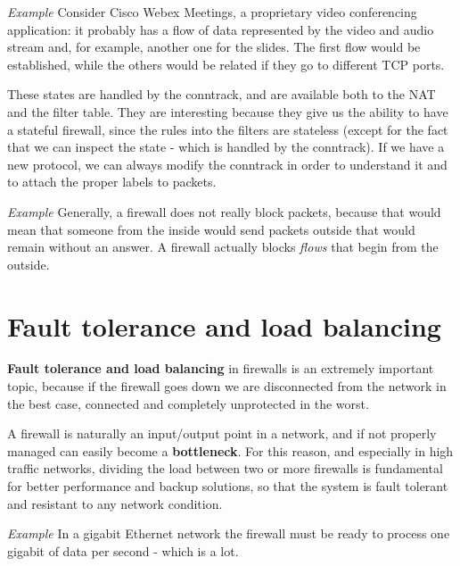 \vspace{0.5em}

\emph{Example} Consider Cisco Webex Meetings, a proprietary video conferencing application: it probably has a flow of data represented by the video and audio stream and, for example, another one for the slides. The first flow would be established, while the others would be related if they go to different TCP ports.

\vspace{0.5em}
	
These states are handled by the conntrack, and are available both to the NAT and the filter table. They are interesting because they give us the ability to have a stateful firewall, since the rules into the filters are stateless (except for the fact that we can inspect the state - which is handled by the conntrack). If we have a new protocol, we can always modify the conntrack in order to understand it and to attach the proper labels to packets.

\vspace{0.5em}

\emph{Example} Generally, a firewall does not really block packets, because that would mean that someone from the inside would send packets outside that would remain without an answer. A firewall actually blocks \textit{flows} that begin from the outside.


\section{Fault tolerance and load balancing}
\textbf{Fault tolerance and load balancing} in firewalls is an extremely important topic, because if the firewall goes down we are disconnected from the network in the best case, connected and completely unprotected in the worst.

A firewall is naturally an input/output point in a network, and if not properly managed can easily become a \textbf{bottleneck}. For this reason, and especially in high traffic networks, dividing the load between two or more firewalls is fundamental for better performance and backup solutions, so that the system is fault tolerant and resistant to any network condition.

\vspace{0.5em}

\emph{Example} In a gigabit Ethernet network the firewall must be ready to process one gigabit of data per second - which is a lot.

